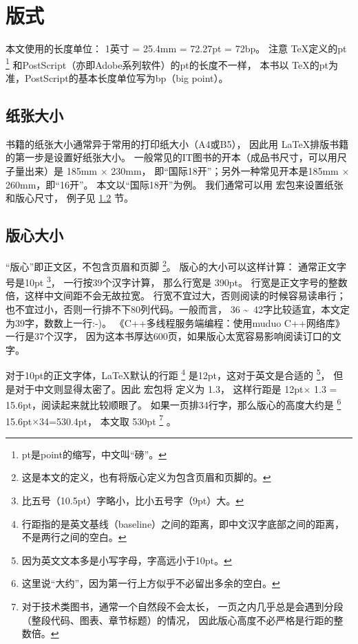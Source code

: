 \chapter{版式}
本文使用的长度单位：
1英寸 = 25.4mm = 72.27pt = 72bp。
注意 \TeX 定义的pt\nolinebreak
\footnote{pt是point的缩写，中文叫“磅”。} 和PostScript（亦即Adobe系列软件）的pt的长度不一样，
本书以 \TeX 的pt为准，PostScript的基本长度单位写为bp（big point）。

\section{纸张大小} %

书籍的纸张大小通常异于常用的打印纸大小（A4或B5），
因此用 \LaTeX 排版书籍的第一步是设置好纸张大小。
一般常见的IT图书的开本（成品书尺寸，可以用尺子量出来）是 185mm $\times$ 230mm，
即“国际18开”；另外一种常见开本是185mm $\times$ 260mm，即“16开”。
本文以“国际18开”为例。
我们通常可以用  宏包来设置纸张和版心尺寸，
例子见 \ref{sec:textbody} 节。

\section{版心大小} %
\label{sec:textbody}

“版心”即正文区，不包含页眉和页脚
\footnote{这是本文的定义，也有将版心定义为包含页眉和页脚的。}。
版心的大小可以这样计算：
通常正文字号是10pt
\footnote{比五号（10.5pt）字略小，比小五号字（9pt）大。}，
一行按39个汉字计算，
那么行宽是 390pt。
行宽是正文字号的整数倍，这样中文间距不会无故拉宽。
行宽不宜过大，否则阅读的时候容易读串行；
也不宜过小，否则一行排不下80列代码。一般而言，
36 \textasciitilde\ 42字比较适宜，本文定为39字，数数上一行:-)。
《C++多线程服务端编程：使用muduo C++网络库》一行是37个汉字，
因为这本书厚达600页，如果版心太宽容易影响阅读订口的文字。

对于10pt的正文字体，\LaTeX 默认的行距
\footnote{行距指的是英文基线（baseline）之间的距离，即中文汉字底部之间的距离，
不是两行之间的空白。} 是12pt，这对于英文是合适的
\footnote{因为英文文本多是小写字母，字高远小于10pt。}，
但是对于中文则显得太密了。因此 \CTeX 宏包将  定义为 1.3，
这样行距是 12pt$\times$ 1.3 = 15.6pt，阅读起来就比较顺眼了。
如果一页排34行字，那么版心的高度大约是
\footnote{这里说“大约”，因为第一行上方似乎不必留出多余的空白。} 15.6pt$\times$34=530.4pt，
本文取 530pt
\footnote{对于技术类图书，通常一个自然段不会太长，
一页之内几乎总是会遇到分段（整段代码、图表、章节标题）的情况，
因此版心高度不必严格是行距的整数倍。} 。

